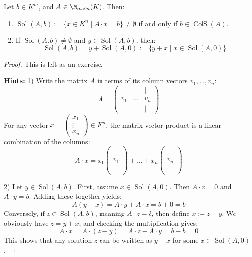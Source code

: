 \begin{corollary}
\label{cor:non_homogeneous_solutions}
Let $b \in K^m$, and $A \in \M_{m \times n}(K)$. Then:
\begin{enumerate}
    \item $\operatorname{Sol}(A, b) := \{x \in K^n \mid A \cdot x = b\} \neq \emptyset$ if and only if $b \in \operatorname{ColS}(A)$.
    \item If $\operatorname{Sol}(A, b) \neq \emptyset$ and $y \in \operatorname{Sol}(A, b)$, then:
    \begin{equation*}
        \operatorname{Sol}(A, b) = y + \operatorname{Sol}(A, 0) := \{y + x \mid x \in \operatorname{Sol}(A, 0)\}
    \end{equation*}
\end{enumerate}
\end{corollary}

\begin{proof}
This is left as an exercise.

\textbf{Hints:}
1) Write the matrix $A$ in terms of its column vectors $v_1, \dots, v_n$:
\begin{equation*}
    A = \begin{pmatrix} | & & | \\ v_1 & \dots & v_n \\ | & & | \end{pmatrix}
\end{equation*}
For any vector $x = \begin{pmatrix} x_1 \\ \vdots \\ x_n \end{pmatrix} \in K^n$, the matrix-vector product is a linear combination of the columns:
\begin{equation*}
    A \cdot x = x_1 \begin{pmatrix} | \\ v_1 \\ | \end{pmatrix} + \dots + x_n \begin{pmatrix} | \\ v_n \\ | \end{pmatrix}
\end{equation*}

2) Let $y \in \operatorname{Sol}(A, b)$. First, assume $x \in \operatorname{Sol}(A, 0)$. Then $A \cdot x = 0$ and $A \cdot y = b$. Adding these together yields:
\begin{equation*}
    A(y + x) = A \cdot y + A \cdot x = b + 0 = b
\end{equation*}
Conversely, if $z \in \operatorname{Sol}(A, b)$, meaning $A \cdot z = b$, then define $x := z - y$. We obviously have $z = y + x$, and checking the multiplication gives:
\begin{equation*}
    A \cdot x = A \cdot (z - y) = A \cdot z - A \cdot y = b - b = 0
\end{equation*}
This shows that any solution $z$ can be written as $y + x$ for some $x \in \operatorname{Sol}(A, 0)$.
\end{proof}

